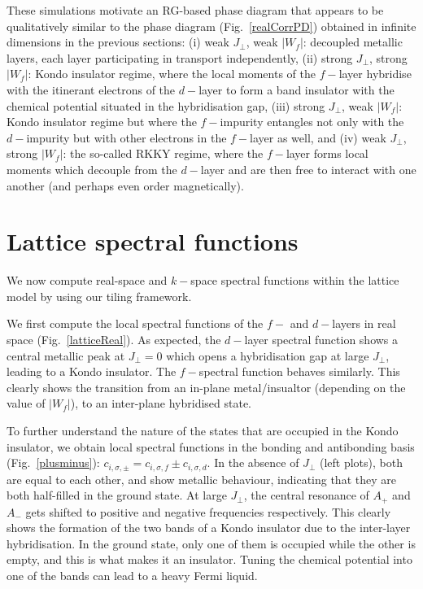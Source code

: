 These simulations motivate an RG-based phase diagram that appears to be qualitatively similar to the phase diagram (Fig.~\ref{realCorrPD}) obtained in infinite dimensions in the previous sections: (i) weak \(J_\perp\), weak \(|W_f|\): decoupled metallic layers, each layer participating in transport independently, (ii) strong \(J_\perp\), strong \(|W_f|\): Kondo insulator regime, where the local moments of the \(f-\)layer hybridise with the itinerant electrons of the \(d-\)layer to form a band insulator with the chemical potential situated in the hybridisation gap, (iii) strong \(J_\perp\), weak \(|W_f|\): Kondo insulator regime but where the \(f-\)impurity entangles not only with the \(d-\)impurity but with other electrons in the \(f-\)layer as well, and (iv) weak \(J_\perp\), strong \(|W_f|\): the so-called RKKY regime, where the \(f-\)layer forms local moments which decouple from the \(d-\)layer and are then free to interact with one another (and perhaps even order magnetically).

\section{Lattice spectral functions}
We now compute real-space and \(k-\)space spectral functions within the lattice model by using our tiling framework. 

We first compute the local spectral functions of the \(f-\) and \(d-\)layers in real space (Fig.~\ref{latticeReal}). As expected, the \(d-\)layer spectral function shows a central metallic peak at \(J_\perp=0\) which opens a hybridisation gap at large \(J_\perp\), leading to a Kondo insulator. The \(f-\)spectral function behaves similarly. This clearly shows the transition from an in-plane metal/insualtor (depending on the value of \(|W_f|\)), to an inter-plane hybridised state.

To further understand the nature of the states that are occupied in the Kondo insulator, we obtain local spectral functions in the bonding and antibonding basis (Fig.~\ref{plusminus}): \(c_{i,\sigma,\pm} = c_{i,\sigma,f} \pm c_{i,\sigma,d}\). In the absence of \(J_\perp\) (left plots), both are equal to each other, and show metallic behaviour, indicating that they are both half-filled in the ground state. At large \(J_\perp\), the central resonance of \(A_+\) and \(A_-\) gets shifted to positive and negative frequencies respectively. This clearly shows the formation of the two bands of a Kondo insulator due to the inter-layer hybridisation. In the ground state, only one of them is occupied while the other is empty, and this is what makes it an insulator. Tuning the chemical potential into one of the bands can lead to a heavy Fermi liquid.

